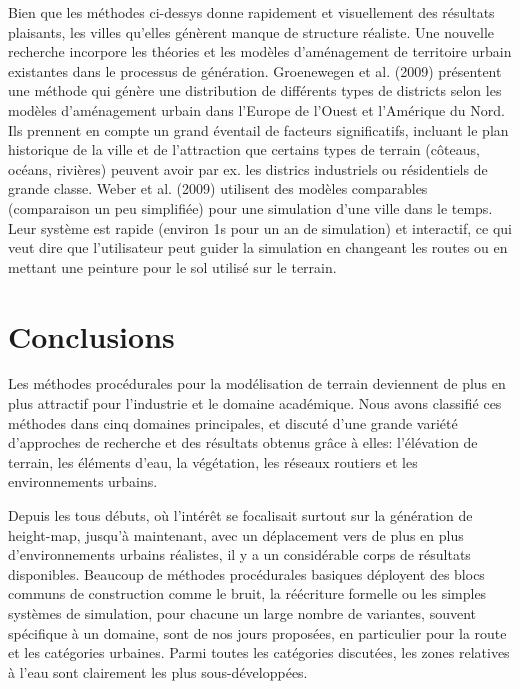 \documentclass[11pt]{report}
\begin{document}
Bien que les méthodes ci-dessys donne rapidement et visuellement des résultats plaisants, les villes qu'elles génèrent manque de structure réaliste. Une nouvelle recherche incorpore les théories et les modèles d'aménagement de territoire urbain existantes dans le processus de génération. Groenewegen et al. (2009) présentent une méthode qui génère une distribution de différents types de districts selon les modèles d'aménagement urbain dans l'Europe de l'Ouest et l'Amérique du Nord. Ils prennent en compte un grand éventail de facteurs significatifs, incluant le plan historique de la ville et de l'attraction que certains types de terrain (côteaus, océans, rivières) peuvent avoir par ex. les districs industriels ou résidentiels de grande classe. Weber et al. (2009) utilisent des modèles comparables (comparaison un peu simplifiée) pour une simulation d'une ville dans le temps. Leur système est rapide (environ 1s pour un an de simulation) et interactif, ce qui veut dire que l'utilisateur peut guider la simulation en changeant les routes ou en mettant une peinture pour le sol utilisé sur le terrain.

\section{Conclusions}

Les méthodes procédurales pour la modélisation de terrain deviennent de plus en plus attractif pour l'industrie et le domaine académique. Nous avons classifié ces méthodes dans cinq domaines principales, et discuté d'une grande variété d'approches de recherche et des résultats obtenus grâce à elles: l'élévation de terrain, les éléments d'eau, la végétation, les réseaux routiers et les environnements urbains. \newline

Depuis les tous débuts, où l'intérêt se focalisait surtout sur la génération de height-map, jusqu'à maintenant, avec un déplacement vers de plus en plus d'environnements urbains réalistes, il y a un considérable corps de résultats disponibles. Beaucoup de méthodes procédurales basiques déployent des blocs communs de construction comme le bruit, la réécriture formelle ou les simples systèmes de simulation, pour chacune un large nombre de variantes, souvent spécifique à un domaine, sont de nos jours proposées, en particulier pour la route et les catégories urbaines. Parmi toutes les catégories discutées, les zones relatives à l'eau sont clairement les plus sous-développées.\newline
\end{document}
